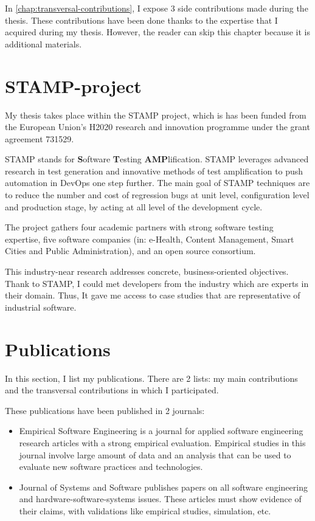 In \autoref{chap:transversal-contributions}, I expose 3 side contributions made during the thesis.
These contributions have been done thanks to the expertise that I acquired during my thesis.
However, the reader can skip this chapter because it is additional materials.

\section{STAMP-project}
\label{sec:intro:stamp}

My thesis takes place within the STAMP project, which is has been funded from the European Union's H2020 research and innovation programme under the grant agreement 731529.

STAMP stands for \textbf{S}oftware \textbf{T}esting \textbf{AMP}lification.
STAMP leverages advanced research in test generation and innovative methods of test amplification to push automation in DevOps one step further.
The main goal of STAMP techniques are to reduce the number and cost of regression bugs at unit level, configuration level and production stage, by acting at all level of the development cycle.

The project gathers four academic partners with strong software testing expertise, five software companies (in: e-Health, Content Management, Smart Cities and Public Administration), and an open source consortium. 

This industry-near research addresses concrete, business-oriented objectives. Thank to STAMP, I could met developers from the industry which are experts in their domain.
Thus, It gave me access to case studies that are representative of industrial software.

\section{Publications}
\label{sec:intro:publications}

In this section, I list my publications. 
There are 2 lists: my main contributions and the transversal contributions in which I participated.

These publications have been published in 2 journals:
\begin{itemize}
	\item Empirical Software Engineering is a journal for applied software engineering research articles with a strong empirical evaluation. Empirical studies in this journal involve large amount of data and an analysis that can be used to evaluate new software practices and technologies.
	\item Journal of Systems and Software publishes papers on all software engineering and hardware-software-systems issues. These articles must show evidence of their claims, with validations like empirical studies, simulation, etc.
\end{itemize}

